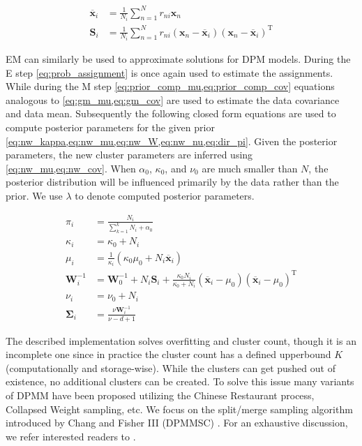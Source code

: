 \begin{secDefinition}
\begin{align}
\overline{\mathbf{x}}_{i} &=\frac{1}{N_{i}} \sum_{n=1}^{N} r_{n i} \mathbf{x}_{n} \label{eq:prior_comp_mu} \\
\mathbf{S}_{i} &=\frac{1}{N_{i}} \sum_{n=1}^{N} r_{n i}\left(\mathbf{x}_{n}-\overline{\mathbf{x}}_{i}\right)\left(\mathbf{x}_{n}-\overline{\mathbf{x}}_{i}\right)^{\mathrm{T}} \label{eq:prior_comp_cov}
\end{align}

EM can similarly be used to approximate solutions for DPM models. 
During the E step \cref{eq:prob_assignment} is once again used to estimate the assignments. 
While during the M step \cref{eq:prior_comp_mu,eq:prior_comp_cov} equations analogous to \cref{eq:gm_mu,eq:gm_cov} are used to estimate the data covariance and data mean.
Subsequently the following closed form equations are used to compute posterior parameters for the given prior \cref{eq:nw_kappa,eq:nw_mu,eq:nw_W,eq:nw_nu,eq:dir_pi}.
Given the posterior parameters, the new cluster parameters are inferred using \cref{eq:nw_mu,eq:nw_cov}.
When $\alpha_0$, $\kappa_0$, and $\nu_0$ are much smaller than $N$, the posterior distribution will be influenced primarily by the data rather than the prior.
We use $\lambda$ to denote computed posterior parameters.

\begin{align}
\pi_i &= \frac{N_i}{\sum_{k=1}^k N_i + \alpha_0} \label{eq:dir_pi} \\
\kappa_{i} &=\kappa_{0}+N_{i} \label{eq:nw_kappa} \\
\mu_{i} &=\frac{1}{\kappa_{i}}\left(\kappa_{0} \mu_{0}+N_{i} \overline{\mathbf{x}}_{i}\right) \label{eq:nw_mu} \\
\mathbf{W}_{i}^{-1} &=\mathbf{W}_{0}^{-1}+N_{i} \mathbf{S}_{i}+\frac{\kappa_{0} N_{i}}{\kappa_{0}+N_{i}}\left(\overline{\mathbf{x}}_{i}-\mu_{0}\right)\left(\overline{\mathbf{x}}_{i}-\mu_{0}\right)^{\mathrm{T}} \label{eq:nw_W} \\
\nu_{i} &=\nu_{0}+N_{i} \label{eq:nw_nu} \\
\boldsymbol{\Sigma}_i &= \frac{\nu \mathbf{W}_{i}^{-1}}{\nu - d + 1} \label{eq:nw_cov}
\end{align}

The described implementation solves overfitting and cluster count, though it is an incomplete one since in practice the cluster count has a defined upperbound $K$ (computationally and storage-wise).
While the clusters can get pushed out of existence, no additional clusters can be created.
To solve this issue many variants of DPMM have been proposed utilizing the Chinese Restaurant process, Collapsed Weight sampling, etc. 
We focus on the split/merge sampling algorithm introduced by Chang and Fisher III (DPMMSC) \cite{changParallelSamplingDP2013a}.
For an exhaustive discussion, we refer interested readers to \cite{bishopPatternRecognitionMachine2006, changSamplingComputerVision}.


\end{secDefinition}
